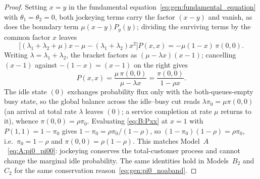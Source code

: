 \begin{proof}
    Setting $x=y$ in the fundamental equation~\eqref{eq:gen:fundamental_equation} with
    $\theta_1=\theta_2=0$, both jockeying terms carry the factor $(x-y)$ and vanish, as
    does the boundary term $\mu(x-y)P_y(y)$; dividing the surviving terms by the common
    factor $x$ leaves
    \begin{equation}
        \bigl[(\lambda_1+\lambda_2+\mu)x - \mu - (\lambda_1+\lambda_2)x^2\bigr]P(x,x)
        = -\mu(1-x)\,\pi(0,0).
        \label{eq:B:diagonal_ode}
    \end{equation}
    Writing $\lambda=\lambda_1+\lambda_2$, the bracket factors as $(\mu-\lambda x)(x-1)$;
    cancelling $(x-1)$ against $-(1-x)=(x-1)$ on the right gives
    \begin{equation}
        P(x,x) = \frac{\mu\,\pi(0,0)}{\mu-\lambda x} = \frac{\pi(0,0)}{1-\rho x}.
        \label{eq:B:Pxx}
    \end{equation}
    The idle state $(0)$ exchanges probability flux only with the both-queues-empty busy
    state, so the global balance across the idle--busy cut reads
    $\lambda\pi_0=\mu\pi(0,0)$ (an arrival at total rate $\lambda$ leaves $(0)$; a service
    completion at rate $\mu$ returns to it), whence $\pi(0,0)=\rho\pi_0$. Evaluating
    \eqref{eq:B:Pxx} at $x=1$ with $P(1,1)=1-\pi_0$ gives
    $1-\pi_0=\rho\pi_0/(1-\rho)$, so $(1-\pi_0)(1-\rho)=\rho\pi_0$, i.e.\ $\pi_0=1-\rho$
    and $\pi(0,0)=\rho(1-\rho)$. This matches Model~$A$~\eqref{eq:A:pi0_pi00}: jockeying
    conserves the total-customer process and cannot change the marginal idle probability.
    The same identities hold in Models~$B_2$ and~$C_2$ for the same conservation
    reason~\eqref{eq:gen:pi0_noaband}.
\end{proof}

